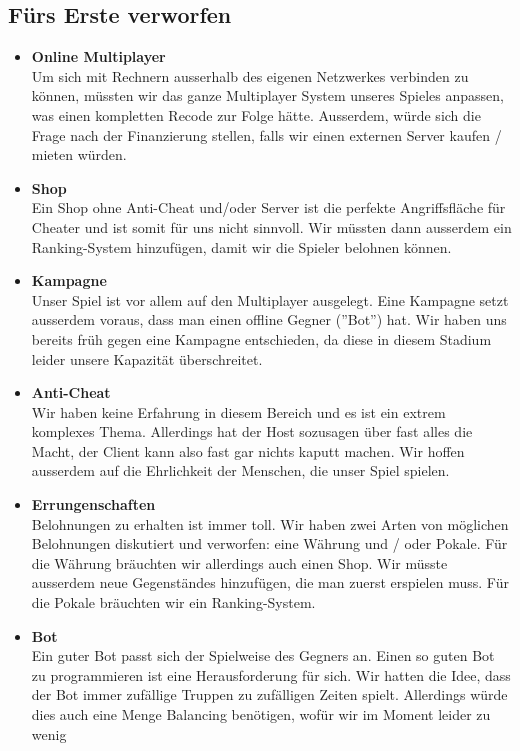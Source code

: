 \subsection{Fürs Erste verworfen}
\begin{itemize}
    \item \textbf{Online Multiplayer} \\
        Um sich mit Rechnern ausserhalb des eigenen Netzwerkes verbinden zu können, müssten wir das ganze Multiplayer System unseres Spieles anpassen, was einen kompletten Recode zur Folge hätte. 
        Ausserdem, würde sich die Frage nach der Finanzierung stellen, falls wir einen externen Server kaufen / mieten würden. 
    \item \textbf{Shop} \\
        Ein Shop ohne Anti-Cheat und/oder Server ist die perfekte Angriffsfläche für Cheater und ist somit für uns nicht sinnvoll. Wir müssten dann ausserdem ein Ranking-System
        hinzufügen, damit wir die Spieler belohnen können.
    \item \textbf{Kampagne} \\
        Unser Spiel ist vor allem auf den Multiplayer ausgelegt. Eine Kampagne setzt ausserdem voraus, dass man einen offline Gegner (''Bot'') hat. Wir haben uns bereits 
        früh gegen eine Kampagne entschieden, da diese in diesem Stadium leider unsere Kapazität überschreitet.
    \item \textbf{Anti-Cheat} \\
        Wir haben keine Erfahrung in diesem Bereich und es ist ein extrem komplexes Thema. Allerdings hat der Host sozusagen über fast alles die Macht, der Client kann also fast
        gar nichts kaputt machen. Wir hoffen ausserdem auf die Ehrlichkeit der Menschen, die unser Spiel spielen.
    \item \textbf{Errungenschaften} \\
        Belohnungen zu erhalten ist immer toll. Wir haben zwei Arten von möglichen Belohnungen diskutiert und verworfen: eine Währung und / oder Pokale.
        Für die Währung bräuchten wir allerdings auch einen Shop. Wir müsste ausserdem neue Gegenständes hinzufügen,
        die man zuerst erspielen muss. Für die Pokale bräuchten wir ein Ranking-System.
    \item \textbf{Bot} \\
        Ein guter Bot passt sich der Spielweise des Gegners an. Einen so guten Bot zu programmieren ist eine Herausforderung für sich. Wir hatten die Idee,
        dass der Bot immer zufällige Truppen zu zufälligen Zeiten spielt. Allerdings würde dies auch eine Menge Balancing benötigen, wofür wir im Moment leider zu wenig

\end{itemize}
